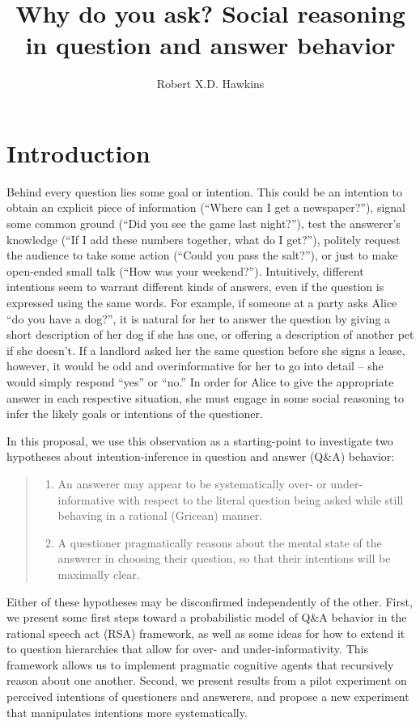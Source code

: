 \documentclass[12pt]{amsart}
\title{Why do you ask? Social reasoning in question and answer behavior}
\author{Robert X.D. Hawkins}
\begin{document}
\maketitle


\section{Introduction}

Behind every question lies some goal or intention. This could be an intention to obtain an explicit piece of information (``Where can I get a newspaper?''), signal some common ground (``Did you see the game last night?''), test the answerer's knowledge (``If I add these numbers together, what do I get?''), politely request the audience to take some action (``Could you pass the salt?''), or just to make open-ended small talk (``How was your weekend?''). Intuitively, different intentions seem to warrant different kinds of answers, even if the question is expressed using the same words. For example, if someone at a party asks Alice ``do you have a dog?'', it is natural for her to answer the question by giving a short description of her dog if she has one, or offering a description of another pet if she doesn't. If a landlord asked her the same question before she signs a lease, however, it would be odd and overinformative for her to go into detail -- she would simply respond ``yes'' or ``no.'' In order for Alice to give the appropriate answer in each respective situation, she must engage in some social reasoning to infer the likely goals or intentions of the questioner. 

In this proposal, we use this observation as a starting-point to investigate two hypotheses about intention-inference in question and answer (Q\&A) behavior: 
\begin{quote}
\begin{enumerate}[(1)]
\item An answerer may appear to be systematically over- or under-informative with respect to the literal question being asked while still behaving in a rational (Gricean) manner.
\item A questioner pragmatically reasons about the mental state of the answerer in choosing their question, so that their intentions will be maximally clear. 
\end{enumerate}
\end{quote}

Either of these hypotheses may be disconfirmed independently of the other. First, we present some first steps toward a probabilistic model of Q\&A behavior in the rational speech act (RSA) framework, as well as some ideas for how to extend it to question hierarchies that allow for over- and under-informativity. This framework allows us to implement pragmatic cognitive agents that recursively reason about one another. Second, we present results from a pilot experiment on perceived intentions of questioners and answerers, and propose a new experiment that manipulates intentions more systematically.
\end{document}
